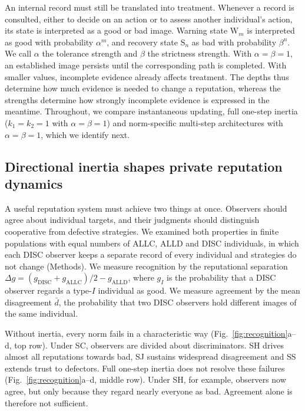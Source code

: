 \documentclass[fleqn,10pt]{wlscirep}
\newcommand{\st}[1]{\mathrm{#1}}           %
\newcommand{\ALLC}{\mathrm{ALLC}}
\newcommand{\ALLD}{\mathrm{ALLD}}
\newcommand{\DISC}{\mathrm{DISC}}
\theoremstyle{plain}
\begin{document}
An internal record must still be translated into treatment. Whenever a record is consulted, either to decide on an action or to assess another individual's action, its state is interpreted as a good or bad image. Warning state $\st W_m$ is interpreted as good with probability $\alpha^m$, and recovery state $\st S_n$ as bad with probability $\beta^n$. We call $\alpha$ the tolerance strength and $\beta$ the strictness strength. With $\alpha=\beta=1$, an established image persists until the corresponding path is completed. With smaller values, incomplete evidence already affects treatment. The depths thus determine how much evidence is needed to change a reputation, whereas the strengths determine how strongly incomplete evidence is expressed in the meantime. Throughout, we compare instantaneous updating, full one-step inertia ($k_1=k_2=1$ with $\alpha=\beta=1$) and norm-specific multi-step architectures with $\alpha=\beta=1$, which we identify next.

\subsection*{Directional inertia shapes private reputation dynamics}

A useful reputation system must achieve two things at once. Observers should agree about individual targets, and their judgments should distinguish cooperative from defective strategies. We examined both properties in finite populations with equal numbers of ALLC, ALLD and DISC individuals, in which each DISC observer keeps a separate record of every individual and strategies do not change (Methods). We measure recognition by the reputational separation $\Delta g=(g_{\DISC}+g_{\ALLC})/2-g_{\ALLD}$, where $g_I$ is the probability that a DISC observer regards a type-$I$ individual as good. We measure agreement by the mean disagreement $\bar d$, the probability that two DISC observers hold different images of the same individual.

Without inertia, every norm fails in a characteristic way (Fig.~\ref{fig:recognition}a--d, top row). Under SC, observers are divided about discriminators. SH drives almost all reputations towards bad, SJ sustains widespread disagreement and SS extends trust to defectors. Full one-step inertia does not resolve these failures (Fig.~\ref{fig:recognition}a--d, middle row). Under SH, for example, observers now agree, but only because they regard nearly everyone as bad. Agreement alone is therefore not sufficient.
\end{document}
